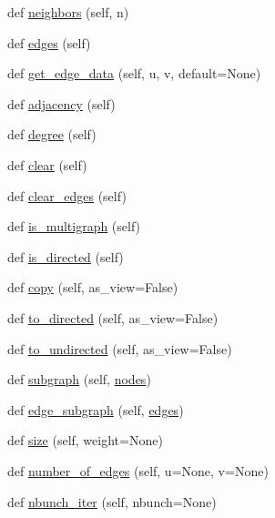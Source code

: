 \begin{DoxyCompactItemize}
def \hyperlink{classnetworkx_1_1classes_1_1graph_1_1Graph_ae3e67a702c31c6712f6c8205e5a246f2}{neighbors} (self, n)
\item 
def \hyperlink{classnetworkx_1_1classes_1_1graph_1_1Graph_a82640e2156b34c7c6c64c9bcb0295521}{edges} (self)
\item 
def \hyperlink{classnetworkx_1_1classes_1_1graph_1_1Graph_ab2431ffc2332108f4a2724a352205395}{get\+\_\+edge\+\_\+data} (self, u, v, default=None)
\item 
def \hyperlink{classnetworkx_1_1classes_1_1graph_1_1Graph_ae0a69c5d07c08d2f3e932f73845989ff}{adjacency} (self)
\item 
def \hyperlink{classnetworkx_1_1classes_1_1graph_1_1Graph_ad6c8ec6a4c6f1d1665f107ab4ab7199d}{degree} (self)
\item 
def \hyperlink{classnetworkx_1_1classes_1_1graph_1_1Graph_aabafdb4a4bbef0e488fc3a18b5f4fb4f}{clear} (self)
\item 
def \hyperlink{classnetworkx_1_1classes_1_1graph_1_1Graph_aa689153e9174c132ce6beb9289c11119}{clear\+\_\+edges} (self)
\item 
def \hyperlink{classnetworkx_1_1classes_1_1graph_1_1Graph_a3c5ee2e371424829d6ac6a47e32b8460}{is\+\_\+multigraph} (self)
\item 
def \hyperlink{classnetworkx_1_1classes_1_1graph_1_1Graph_abe76c34d26c7acd7d2a87b198da554ff}{is\+\_\+directed} (self)
\item 
def \hyperlink{classnetworkx_1_1classes_1_1graph_1_1Graph_af5b1281d6428d14a74984c699e748eb9}{copy} (self, as\+\_\+view=False)
\item 
def \hyperlink{classnetworkx_1_1classes_1_1graph_1_1Graph_a937efdf6cfa28140e34c61b7b5663107}{to\+\_\+directed} (self, as\+\_\+view=False)
\item 
def \hyperlink{classnetworkx_1_1classes_1_1graph_1_1Graph_aabcff98c46e402281de59737607261cf}{to\+\_\+undirected} (self, as\+\_\+view=False)
\item 
def \hyperlink{classnetworkx_1_1classes_1_1graph_1_1Graph_a62b1ba8e0ec5505c68eb398323902cbc}{subgraph} (self, \hyperlink{classnetworkx_1_1classes_1_1graph_1_1Graph_ab5b03b460e5b1f2a06feaddcfb4fda3a}{nodes})
\item 
def \hyperlink{classnetworkx_1_1classes_1_1graph_1_1Graph_a7e500aeb6bfa21f9120e0eecd36ebd83}{edge\+\_\+subgraph} (self, \hyperlink{classnetworkx_1_1classes_1_1graph_1_1Graph_a82640e2156b34c7c6c64c9bcb0295521}{edges})
\item 
def \hyperlink{classnetworkx_1_1classes_1_1graph_1_1Graph_a77c3649ca7ade87814d9d2ae514277a4}{size} (self, weight=None)
\item 
def \hyperlink{classnetworkx_1_1classes_1_1graph_1_1Graph_ab8099b482e74662582c105e2f9476a7f}{number\+\_\+of\+\_\+edges} (self, u=None, v=None)
\item 
def \hyperlink{classnetworkx_1_1classes_1_1graph_1_1Graph_af3d8e12d43e4ef1973985e4cd45823b3}{nbunch\+\_\+iter} (self, nbunch=None)
\end{DoxyCompactItemize}
